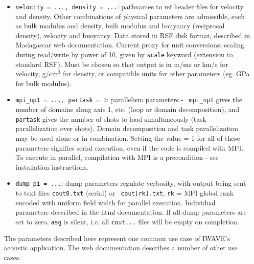 \begin{itemize}
{    hdrfile}, and generally is not the same as the time step used in
  the simulation, the trace samples being resampled on output. Note
  also that pathnames may be either fully qualified (as in the {\tt hdrfile}
  entry) or relative.
\item {\tt velocity = ..., density = ...}: pathnames to rsf header
  files for velocity and density. Other combinations of physical
  parameters are admissible, such as bulk modulus and density, bulk
  modulus and bouyancy (reciprocal density), velocity and
  buoyancy. Data stored in RSF disk format, described in Madagascar
  web documentation. Current proxy for unit conversions: scaling
  during read/write by power of 10, given by {\tt scale} keyword
  (extension to standard RSF). Must be chosen so that output is in
  m/ms or km/s for velocity, g/cm$^3$ for density, or compatible units
  for other parameters (eg. GPa for bulk modulus).
\item {\tt mpi\_np1 = ..., partask = 1}: parallelism parameters - {\tt
    mpi\_np1} gives the number of domains along axis 1, etc. (loop or
  domain decomposition), and
  {\tt partask} gives the number of shots to load simultaneously
  (task parallelization over shots). Domain decomposition and task
  parallelization may be used alone or in combination. Setting the
  value = 1 for all of these parameters signifies serial execution, even if the
  code is compiled with MPI. To execute in parallel, compilation with
  MPI is a precondition - see installation instructions.
\item {\tt dump\_pi = ...}: dump parameters regulate verbosity, with
  output being sent to text files {\tt cout0.txt} (serial) or {\tt
    cout[rk].txt}, {\tt rk} = MPI global rank encoded with uniform field width for
  parallel execution. Individual parameters described in the html
  documentation. If all dump parameters are set to zero, {\tt asg} is
  silent, i.e. all {\tt cout...} files will be empty on completion. 
\end{itemize}

The parameters described here represent one common use case of IWAVE's
acoustic application. The web documentation describes a number of
other use cases.


